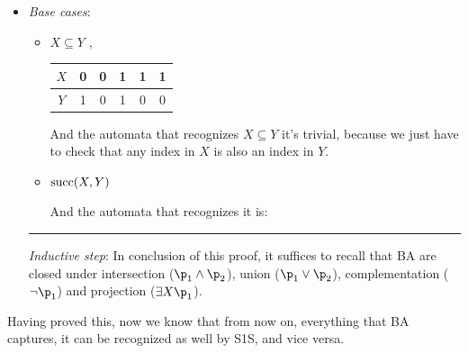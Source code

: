 \documentclass[oneside]{academica}
\begin{document}
\begin{proof*}
  \begin{itemize}
    \item[\color{pink!200}$\Leftarrow$] 
      \textit{Base cases}:
      \vspace{-10pt}
      \begin{itemize}
        \item $X \subseteq Y$ \qquad \qquad \eg,
          \begin{tabular}{c|c|c|c|c|c} 
            $X$ & 0 & 0 & 1 & 1 & 1\\
            \hline
            $Y$ & 1 & 0 & 1 & 0 & 0
          \end{tabular}

          And the automata that recognizes $X \subseteq Y$ it's trivial, because we just have to check that any index in $X$ is also an index in $Y$.
          \begin{center}
            
          \end{center}
        \item $\text{succ}(X,Y)$

          And the automata that recognizes it is:
          \begin{center}
            
          \end{center}
      \end{itemize}
      
      \textcolor{pink!160}{\rule{\textwidth-30pt}{1pt}}

      \textit{Inductive step}:
      In conclusion of this proof, it suffices to recall that BA are closed under intersection ($\p_1 \land \p_2$), union ($\p_1 \lor \p_2$), complementation ($\neg \p_1$) and projection ($\exists X \p_1$).
  \end{itemize}
\end{proof*}

Having proved this, now we know that from now on, everything that BA captures, it can be recognized as well by S1S, and vice versa.
\end{document}
